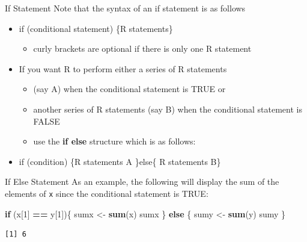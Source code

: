 \documentclass[
  ignorenonframetext,
]{beamer}
\newenvironment{Shaded}{\begin{snugshade}}{\end{snugshade}}
\newcommand{\ControlFlowTok}[1]{\textcolor[rgb]{0.13,0.29,0.53}{\textbf{#1}}}
\newcommand{\DecValTok}[1]{\textcolor[rgb]{0.00,0.00,0.81}{#1}}
\newcommand{\FunctionTok}[1]{\textcolor[rgb]{0.13,0.29,0.53}{\textbf{#1}}}
\newcommand{\NormalTok}[1]{#1}
\newcommand{\OtherTok}[1]{\textcolor[rgb]{0.56,0.35,0.01}{#1}}
\newcommand{\SpecialCharTok}[1]{\textcolor[rgb]{0.81,0.36,0.00}{\textbf{#1}}}
\providecommand{\tightlist}{%
  \setlength{\itemsep}{0pt}\setlength{\parskip}{0pt}}
\begin{document}
\begin{frame}{If Statement}
\label{if-statement-1}
Note that the syntax of an if statement is as follows

\begin{itemize}
\item
  if (conditional statement) \{R statements\}

  \begin{itemize}
  \tightlist
  \item
    curly brackets are optional if there is only one R statement
  \end{itemize}
\item
  If you want R to perform either a series of R statements

  \begin{itemize}
  \tightlist
  \item
    (say A) when the conditional statement is TRUE or
  \item
    another series of R statements (say B) when the conditional
    statement is FALSE
  \item
    use the \textbf{if else} structure which is as follows:
  \end{itemize}
\item
  if (condition) \{R statements A \}else\{ R statements B\}
\end{itemize}
\end{frame}

\begin{frame}[fragile]{If Else Statement}
\label{if-else-statement}
As an example, the following will display the sum of the elements of
\texttt{x} since the conditional statement is TRUE:

\small

\begin{Shaded}
\begin{Highlighting}[]
\ControlFlowTok{if}\NormalTok{ (x[}\DecValTok{1}\NormalTok{] }\SpecialCharTok{==}\NormalTok{ y[}\DecValTok{1}\NormalTok{])\{}
\NormalTok{  sumx }\OtherTok{\textless{}{-}} \FunctionTok{sum}\NormalTok{(x)}
\NormalTok{  sumx}
\NormalTok{\} }\ControlFlowTok{else}\NormalTok{ \{}
\NormalTok{  sumy }\OtherTok{\textless{}{-}} \FunctionTok{sum}\NormalTok{(y)}
\NormalTok{  sumy}
\NormalTok{\}}
\end{Highlighting}
\end{Shaded}

\begin{verbatim}
[1] 6
\end{verbatim}

\normalsize
\end{frame}
\end{document}

